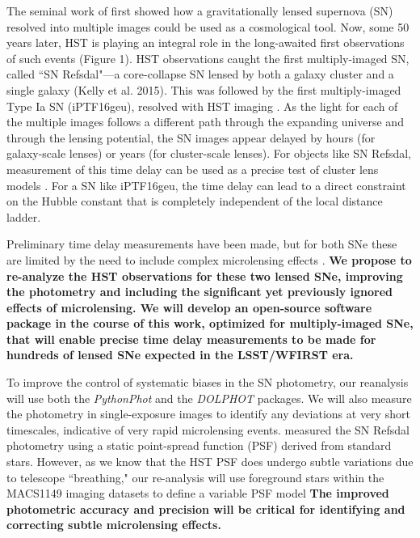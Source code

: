 \forceindent The seminal work of \citet{Refsdal:1964} first showed how a
gravitationally lensed supernova (SN) resolved into multiple images
could be used as a cosmological tool.  Now, some 50 years later, HST
is playing an integral role in the long-awaited first observations of
such events (Figure 1).  HST observations caught the first
multiply-imaged SN, called ``SN Refsdal"---a core-collapse SN lensed
by both a galaxy cluster and a single galaxy (Kelly et al. 2015). This
was followed by the first multiply-imaged Type Ia SN (iPTF16geu),
resolved with HST imaging \citep{Goobar:2016}.  As the light for each
of the multiple images follows a different path through the expanding
universe and through the lensing potential, the SN images appear
delayed by hours (for galaxy-scale lenses) or years (for cluster-scale
lenses). For objects like SN Refsdal, measurement of this time delay
can be used as a precise test of cluster lens
models \citep{Treu:2015b}. For a SN like iPTF16geu, the time delay can
lead to a direct constraint on the Hubble constant that is completely
independent of the local distance ladder.

Preliminary time delay
measurements have been made, but for both SNe these are limited by the
need to include complex microlensing effects \citep{Rodney:2016,
More:2016}.  {\bf We propose to re-analyze the HST observations for
these two lensed SNe, improving the photometry and including the
significant yet previously ignored effects of microlensing.  We will
develop an open-source software package in the course of this work,
optimized for multiply-imaged SNe, that will enable precise time delay
measurements to be made for hundreds of lensed SNe expected in the
LSST/WFIRST era.}

To improve the control of systematic biases in the SN photometry, our
reanalysis will use both the \textit{PythonPhot} and
the \textit{DOLPHOT} packages. We will also measure the photometry in
single-exposure images to identify any deviations at very short
timescales, indicative of very rapid microlensing
events. \cite{Rodney:2016} measured the SN Refsdal photometry using a
static point-spread function (PSF) derived from standard
stars. However, as we know that the HST PSF does undergo subtle
variations due to telescope ``breathing," our re-analysis will use
foreground stars within the MACS1149 imaging datasets to define a
variable PSF model \textbf{The improved photometric accuracy and
precision will be critical for identifying and correcting subtle
microlensing effects.}

